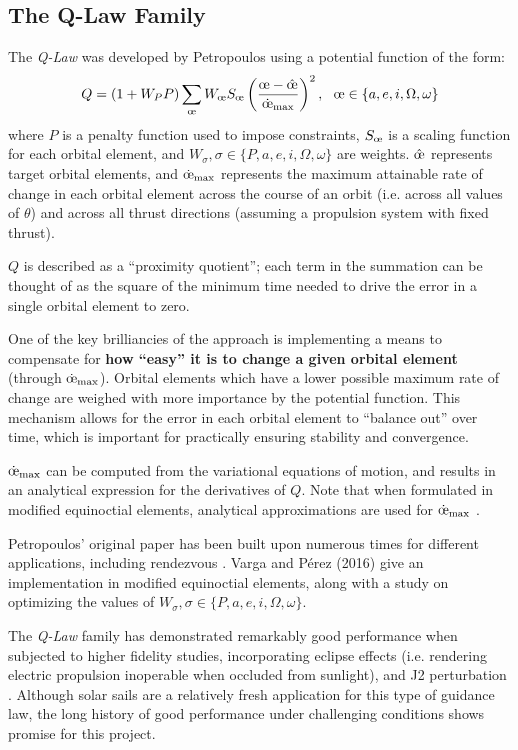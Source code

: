 \subsection{The Q-Law Family}
The \textit{Q-Law} was developed by Petropoulos \cite{petropoulos2004low} using a potential function of the form:
\begin{equation}
    Q = (1 + W_P P) \sum_{\moe} W_\moe S_\moe \left(\frac{\moe - \hat{\moe}}{\dot{\moe}_{\max}} \right)^2, \ \  \moe \in \{a, e, i, \Omega, \omega\}
    \label{eq:q_law_petropulos}
\end{equation}
where $P$ is a penalty function used to impose constraints, $S_\moe$ is a scaling function for each orbital element, and $W_\sigma, \sigma \in \{P, a, e, i, \Omega, \omega\}$ are weights. $\hat{\moe}$ represents target orbital elements, and $\dot{\moe}_{\max}$ represents the maximum attainable rate of change in each orbital element across the course of an orbit (i.e. across all values of $\theta$) and across all thrust directions (assuming a propulsion system with fixed thrust).

$Q$ is described as a ``proximity quotient''; each term in the summation can be thought of as the square of the minimum time needed to drive the error in a single orbital element to zero.

One of the key brilliancies of the approach is implementing a means to compensate for \textbf{how ``easy'' it is to change a given orbital element} (through $\dot{\moe}_{\max}$). Orbital elements which have a lower possible maximum rate of change are weighed with more importance by the potential function. This mechanism allows for the error in each orbital element to ``balance out'' over time, which is important for practically ensuring stability and convergence.

$\dot{\moe}_{\max}$ can be computed from the variational equations of motion, and results in an analytical expression for the derivatives of $Q$. Note that when formulated in modified equinoctial elements, analytical approximations are used for $\dot{\moe}_{\max}$ \cite{vargaperez2016, sanjeev2023}.

Petropoulos' original paper has been built upon numerous times for different applications, including rendezvous \cite{sanjeev2023}. Varga and Pérez (2016) \cite{vargaperez2016} give an implementation in modified equinoctial elements, along with a study on optimizing the values of $W_\sigma, \sigma \in \{P, a, e, i, \Omega, \omega\}$.

The \textit{Q-Law} family has demonstrated remarkably good performance when subjected to higher fidelity studies, incorporating eclipse effects (i.e. rendering electric propulsion inoperable when occluded from sunlight), and J2 perturbation \cite{vargaperez2016}. Although solar sails are a relatively fresh application for this type of guidance law, the long history of good performance under challenging conditions shows promise for this project.

